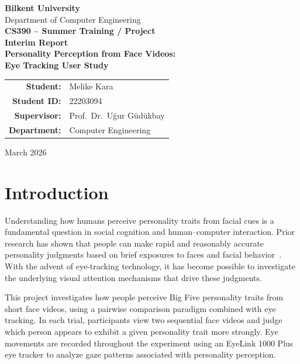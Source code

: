 \documentclass[12pt,a4paper]{article}
\begin{document}
\begin{titlepage}
\centering
\vspace*{2cm}

{\Large\textbf{Bilkent University}}\\[0.3cm]
{\large Department of Computer Engineering}\\[2cm]

{\LARGE\textbf{CS390 -- Summer Training / Project}}\\[0.5cm]
{\LARGE\textbf{Interim Report}}\\[2cm]

{\Large\textbf{Personality Perception from Face Videos:\\Eye Tracking User Study}}\\[2cm]

\begin{tabular}{rl}
\textbf{Student:} & Melike Kara \\
\textbf{Student ID:} & 22203094 \\
\textbf{Supervisor:} & Prof.\ Dr.\ U\u{g}ur G\"{u}d\"{u}kbay \\
\textbf{Department:} & Computer Engineering \\
\end{tabular}

\vfill
{\large March 2026}
\end{titlepage}

\tableofcontents
\newpage

\section{Introduction}

Understanding how humans perceive personality traits from facial cues is a fundamental question in social cognition and human--computer interaction. Prior research has shown that people can make rapid and reasonably accurate personality judgments based on brief exposures to faces and facial behavior~\citep{cafaro2014first, ruhland2014perception}. With the advent of eye-tracking technology, it has become possible to investigate the underlying visual attention mechanisms that drive these judgments.

This project investigates how people perceive Big Five personality traits from short face videos, using a pairwise comparison paradigm combined with eye tracking. In each trial, participants view two sequential face videos and judge which person appears to exhibit a given personality trait more strongly. Eye movements are recorded throughout the experiment using an EyeLink 1000 Plus eye tracker to analyze gaze patterns associated with personality perception.
\end{document}
